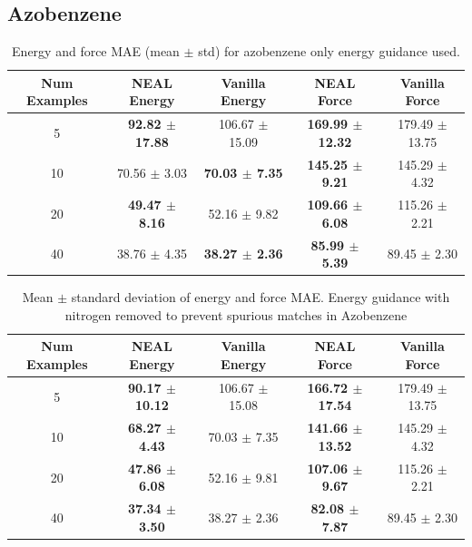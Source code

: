 \documentclass[12pt]{article}
\theoremstyle{definition}
\theoremstyle{remark}
\begin{document}
\subsection{Azobenzene}
\begin{table}[htbp]
\centering
\begin{tabular}{c|cc|cc}
\hline
\textbf{Num Examples} &
\textbf{NEAL Energy } & \textbf{Vanilla Energy } &
\textbf{NEAL Force } & \textbf{Vanilla Force} \\
\hline

5  &
\textbf{92.82 $\pm$ 17.88} &
106.67 $\pm$ 15.09 &
\textbf{169.99 $\pm$ 12.32} &
179.49 $\pm$ 13.75 \\

10 &
70.56 $\pm$ 3.03 &
\textbf{70.03 $\pm$ 7.35} &
\textbf{145.25 $\pm$ 9.21} &
145.29 $\pm$ 4.32 \\

20 &
\textbf{49.47 $\pm$ 8.16} &
52.16 $\pm$ 9.82 &
\textbf{109.66 $\pm$ 6.08} &
115.26 $\pm$ 2.21 \\

40 &
38.76 $\pm$ 4.35 &
\textbf{38.27 $\pm$ 2.36} &
\textbf{85.99 $\pm$ 5.39} &
89.45 $\pm$ 2.30 \\

\hline
\end{tabular}
\caption{Energy and force MAE (mean $\pm$ std) for azobenzene only energy guidance used.}
\end{table}



\begin{table}[htbp!]
\centering
\begin{tabular}{c|cc|cc}
\hline
\textbf{Num Examples} &
\textbf{NEAL Energy} & \textbf{Vanilla Energy} &
\textbf{NEAL Force} & \textbf{Vanilla Force} \\
\hline
5  &
\textbf{90.17 $\pm$ 10.12} &
106.67 $\pm$ 15.08 &
\textbf{166.72 $\pm$ 17.54} &
179.49 $\pm$ 13.75 \\
10 &
\textbf{68.27 $\pm$ 4.43} &
70.03 $\pm$ 7.35 &
\textbf{141.66 $\pm$ 13.52} &
145.29 $\pm$ 4.32 \\
20 &
\textbf{47.86 $\pm$ 6.08} &
52.16 $\pm$ 9.81 &
\textbf{107.06 $\pm$ 9.67} &
115.26 $\pm$ 2.21 \\
40 &
\textbf{37.34 $\pm$ 3.50} &
38.27 $\pm$ 2.36 &
\textbf{82.08 $\pm$ 7.87} &
89.45 $\pm$ 2.30 \\
\hline
\end{tabular}
\caption{Mean $\pm$ standard deviation of energy and force MAE. Energy guidance with nitrogen removed to prevent spurious matches in Azobenzene}
\end{table}
\end{document}
